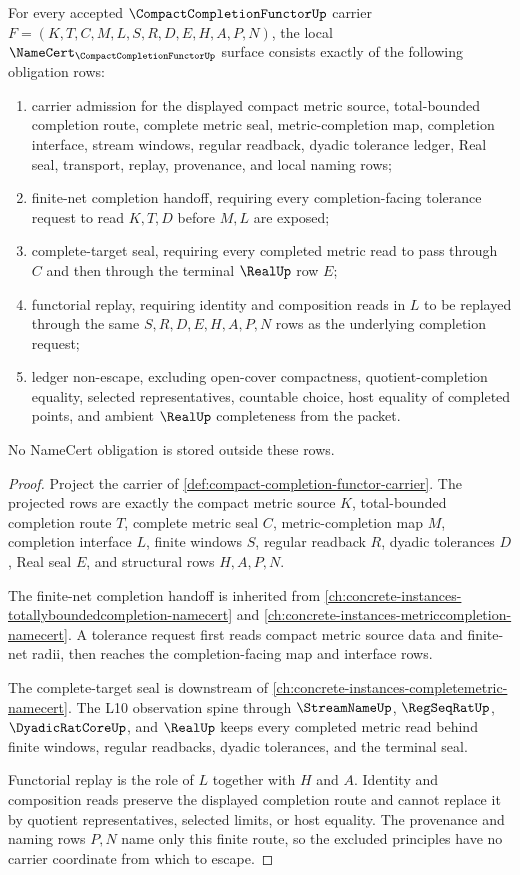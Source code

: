 \begin{theorem}
\label{thm:compact-completion-functor-namecert-obligations}
For every accepted $\CompactCompletionFunctorUp$ carrier $F=(K,T,C,M,L,S,R,D,E,H,A,P,N)$, the local $\NameCert_{\CompactCompletionFunctorUp}$ surface consists exactly of the following obligation rows:
\begin{enumerate}
\item carrier admission for the displayed compact metric source, total-bounded completion route, complete metric seal, metric-completion map, completion interface, stream windows, regular readback, dyadic tolerance ledger, Real seal, transport, replay, provenance, and local naming rows;
\item finite-net completion handoff, requiring every completion-facing tolerance request to read $K,T,D$ before $M,L$ are exposed;
\item complete-target seal, requiring every completed metric read to pass through $C$ and then through the terminal $\RealUp$ row $E$;
\item functorial replay, requiring identity and composition reads in $L$ to be replayed through the same $S,R,D,E,H,A,P,N$ rows as the underlying completion request;
\item ledger non-escape, excluding open-cover compactness, quotient-completion equality, selected representatives, countable choice, host equality of completed points, and ambient $\RealUp$ completeness from the packet.
\end{enumerate}
No NameCert obligation is stored outside these rows.
\end{theorem}
\begin{proof}
Project the carrier of \autoref{def:compact-completion-functor-carrier}. The projected rows are exactly the compact metric source $K$, total-bounded completion route $T$, complete metric seal $C$, metric-completion map $M$, completion interface $L$, finite windows $S$, regular readback $R$, dyadic tolerances $D$, Real seal $E$, and structural rows $H,A,P,N$.

The finite-net completion handoff is inherited from \autoref{ch:concrete-instances-totallyboundedcompletion-namecert} and \autoref{ch:concrete-instances-metriccompletion-namecert}. A tolerance request first reads compact metric source data and finite-net radii, then reaches the completion-facing map and interface rows.

The complete-target seal is downstream of \autoref{ch:concrete-instances-completemetric-namecert}. The L10 observation spine through $\StreamNameUp$, $\RegSeqRatUp$, $\DyadicRatCoreUp$, and $\RealUp$ keeps every completed metric read behind finite windows, regular readbacks, dyadic tolerances, and the terminal seal.

Functorial replay is the role of $L$ together with $H$ and $A$. Identity and composition reads preserve the displayed completion route and cannot replace it by quotient representatives, selected limits, or host equality. The provenance and naming rows $P,N$ name only this finite route, so the excluded principles have no carrier coordinate from which to escape.
\end{proof}

